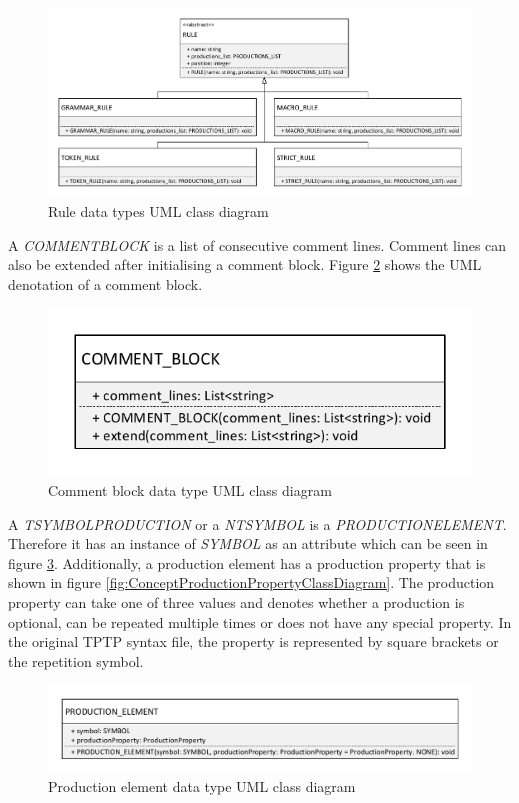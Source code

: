 \begin{figure}[H]
\centering
\includegraphics[width=1\textwidth]{images/Concept_uml_data_types_rules.pdf}
\caption{Rule data types UML class diagram}
\label{fig:ConceptRulesClassDiagram}
\end{figure}

A \textit{COMMENT\textunderscore BLOCK} is a list of consecutive comment lines. Comment lines can also be extended after initialising a comment block. Figure \ref{fig:ConceptCommentBlockClassDiagram} shows the UML denotation of a comment block.

\begin{figure}[H]
\centering
\includegraphics[width=.5\textwidth]{images/Concept_uml_data_types_comment_block.pdf}
\caption{Comment block data type UML class diagram}
\label{fig:ConceptCommentBlockClassDiagram}
\end{figure}

A \textit{T\textunderscore SYMBOL\textunderscore PRODUCTION} or a\textit{ NT\textunderscore SYMBOL} is a \textit{PRODUCTION\textunderscore ELEMENT}. Therefore it has an instance of \textit{SYMBOL} as an attribute which can be seen in figure \ref{fig:ConceptProductionElementClassDiagram}. Additionally, a production element has a production property that is shown in figure \ref{fig:ConceptProductionPropertyClassDiagram}.
The production property can take one of three values and denotes whether a production is optional, can be repeated multiple times or does not have any special property.
In the original \ac{TPTP} syntax file, the property is represented by square brackets or the repetition symbol. 

\begin{figure}[H]
\centering
\includegraphics[width=.8\textwidth]{images/Concept_uml_data_types_production_element.pdf}
\caption{Production element data type UML class diagram}
\label{fig:ConceptProductionElementClassDiagram}
\end{figure}

